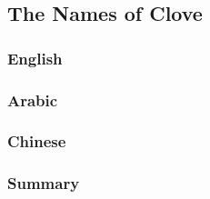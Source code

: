 \subsection{The Names of Clove}

\subsubsection{English}





\subsubsection{Arabic}



\subsubsection{Chinese}



\subsubsection{Summary}















